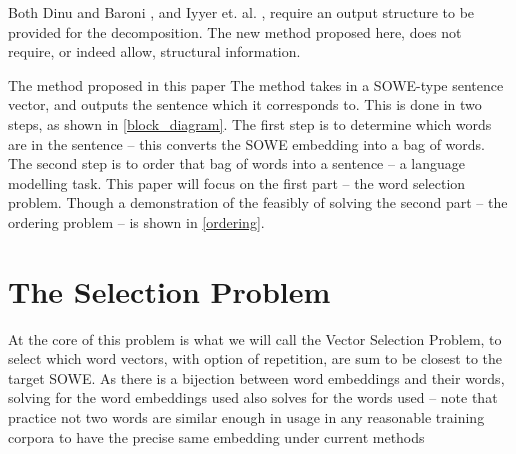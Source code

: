 \documentclass[]{scrartcl}
\numberwithin{equation}{section}
\numberwithin{figure}{section}
\theoremstyle{plain}
\theoremstyle{definition}
\begin{document}
Both Dinu and Baroni \cite{Dinu2014CompositionalGeneration}, and Iyyer et. al. \cite{iyyer2014generating}, require an output structure to be provided for the decomposition.
The new method proposed here, does not require, or indeed allow, structural information.



The method proposed in this paper The method takes in a SOWE-type sentence vector, and outputs the sentence which it corresponds to.
This is done in two steps, as shown in \cref{block_diagram}.
The first step is to determine which words are in the sentence -- this converts the SOWE embedding into a bag of words.
The second step is to order that bag of words into a sentence -- a language modelling task.
This paper will focus on the first part -- the word selection problem. 
Though a demonstration of the feasibly of solving the second part -- the ordering problem --  is shown in \cref{ordering}.

\section {The Selection Problem}


At the core of this problem is what we will call the Vector Selection Problem, to select which word vectors, with option of repetition, are sum to be closest to the target SOWE.
As there is a bijection between word embeddings and their words, solving for the word embeddings used also solves for the words used -- note that practice not two words are similar enough in usage in any reasonable training corpora to have the precise same embedding under current methods
\end{document}
